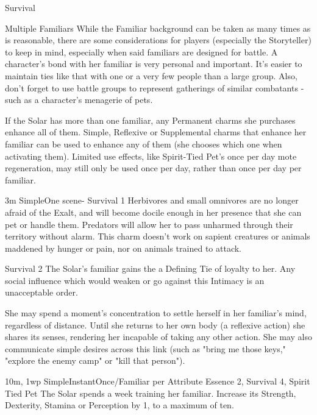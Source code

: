 \begin{Ability}{Survival}

  \begin{sidebar}{Multiple Familiars}
    While the Familiar background can be taken as many times as is reasonable, there are some considerations for players (especially the Storyteller) to keep in mind, especially when said familiars are designed for battle. A character's bond with her familiar is very personal and important. It's easier to maintain ties like that with one or a very few people than a large group. Also, don't forget to use battle groups to represent gatherings of similar combatants - such as a character's menagerie of pets.

    \par\vspace{6pt} If the Solar has more than one familiar, any Permanent charms she purchases enhance all of them. Simple, Reflexive or Supplemental charms that enhance her familiar can be used to enhance any of them (she chooses which one when activating them). Limited use effects, like Spirit-Tied Pet's once per day mote regeneration, may still only be used once per day, rather than once per day per familiar.
  \end{sidebar}

  {3m}
  {Simple}{One scene}{-}
  {Survival 1}
  Herbivores and small omnivores are no longer afraid of the Exalt, and will become docile enough in her presence that she can pet or handle them. Predators will allow her to pass unharmed through their territory without alarm. This charm doesn't work on sapient creatures or animals maddened by hunger or pain, nor on animals trained to attack.

  {Survival 2}
  The Solar's familiar gains the a Defining Tie of loyalty to her. Any social influence which would weaken or go against this Intimacy is an unacceptable order.

  She may spend a moment's concentration to settle herself in her familiar's mind, regardless of distance. Until she returns to her own body (a reflexive action) she shares its senses, rendering her incapable of taking any other action. She may also communicate simple desires across this link (such as "bring me those keys," "explore the enemy camp" or "kill that person").

  {10m, 1wp}
  {Simple}{Instant}{Once/Familiar per Attribute}
  {Essence 2, Survival 4, Spirit Tied Pet}
  The Solar spends a week training her familiar. Increase its Strength, Dexterity, Stamina or Perception by 1, to a maximum of ten.


\end{Ability}
